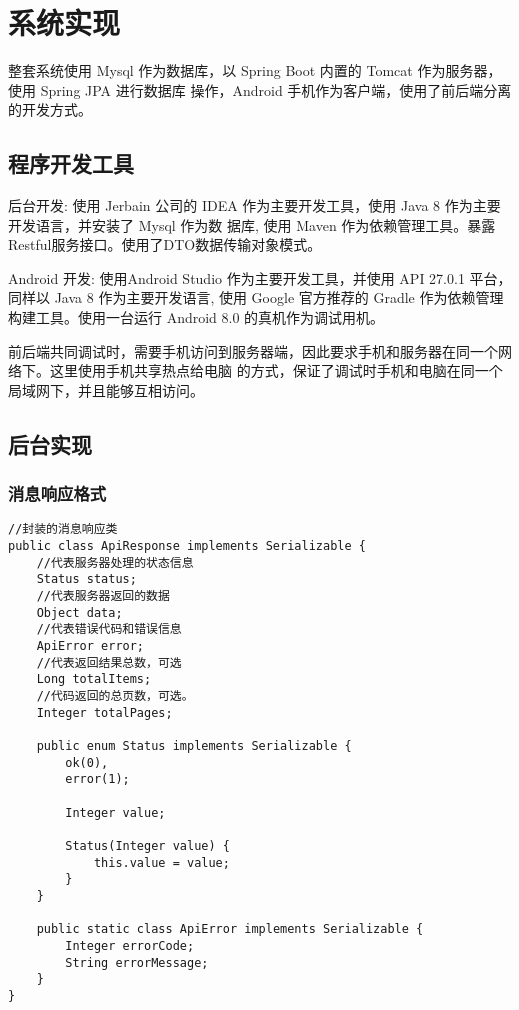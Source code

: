 
\chapter{系统实现}
整套系统使用 Mysql 作为数据库，以 Spring Boot 内置的 Tomcat 作为服务器，使用 Spring JPA 进行数据库
操作，Android 手机作为客户端，使用了前后端分离的开发方式。

\section{程序开发工具}

后台开发: 使用 Jerbain 公司的 IDEA 作为主要开发工具，使用 Java 8 作为主要开发语言，并安装了 Mysql 作为数
据库, 使用 Maven 作为依赖管理工具。暴露Restful服务接口。使用了DTO数据传输对象模式。

Android 开发: 使用Android Studio 作为主要开发工具，并使用 API 27.0.1 平台，同样以 Java 8 作为主要开发语言,
使用 Google 官方推荐的 Gradle 作为依赖管理构建工具。使用一台运行 Android 8.0 的真机作为调试用机。

前后端共同调试时，需要手机访问到服务器端，因此要求手机和服务器在同一个网络下。这里使用手机共享热点给电脑
的方式，保证了调试时手机和电脑在同一个局域网下，并且能够互相访问。

\section{后台实现}

\subsection{消息响应格式}

\begin{verbatim}
//封装的消息响应类
public class ApiResponse implements Serializable {
    //代表服务器处理的状态信息
    Status status;
    //代表服务器返回的数据
    Object data;
    //代表错误代码和错误信息
    ApiError error;
    //代表返回结果总数，可选
    Long totalItems;
    //代码返回的总页数，可选。
    Integer totalPages;

    public enum Status implements Serializable {
        ok(0),
        error(1);

        Integer value;

        Status(Integer value) {
            this.value = value;
        }
    }

    public static class ApiError implements Serializable {
        Integer errorCode;
        String errorMessage;
    }
}
\end{verbatim}

